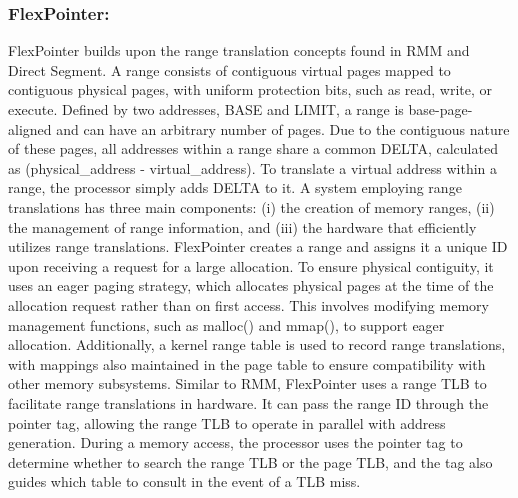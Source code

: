 \subsubsection{FlexPointer:}
FlexPointer\cite{chen_flexpointer_2023} builds upon the range translation concepts found in RMM and Direct Segment. A range consists of contiguous virtual pages mapped 
to contiguous physical pages, with uniform protection bits, such as read, write, or execute. Defined by two addresses, BASE and LIMIT,
a range is base-page-aligned and can have an arbitrary number of pages. Due to the contiguous nature of these pages, 
all addresses within a range share a common DELTA, calculated as (physical\_address - virtual\_address). To translate a 
virtual address within a range, the processor simply adds DELTA to it.
\newline
A system employing range translations has three main components: 
(i) the creation of memory ranges, (ii) the management of range information, 
and (iii) the hardware that efficiently utilizes range translations. FlexPointer 
creates a range and assigns it a unique ID upon receiving a request for a large 
allocation. To ensure physical contiguity, it uses an eager paging strategy, 
which allocates physical pages at the time of the allocation request rather 
than on first access. This involves modifying memory management functions, 
such as malloc() and mmap(), to support eager allocation. Additionally, 
a kernel range table is used to record range translations, with mappings 
also maintained in the page table to ensure compatibility with other memory subsystems.
\newline
Similar to RMM, FlexPointer uses a range TLB to facilitate range translations in hardware. 
It can pass the range ID through the pointer tag, allowing the range TLB to operate in 
parallel with address generation. During a memory access, the processor uses the 
pointer tag to determine whether to search the range TLB or the page TLB, and the 
tag also guides which table to consult in the event of a TLB miss.


